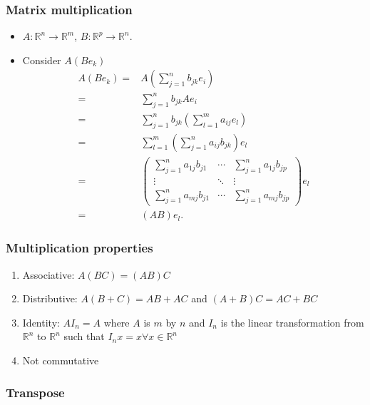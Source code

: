 \documentclass[compress]{beamer}
\def\R{\mathbb{R}}
\begin{document}
\begin{frame}
  \frametitle{Matrix multiplication}
  \begin{itemize}
  \item $A: \R^n \rightarrow \R^m$, $B:\R^p \rightarrow \R^n$.
  \item Consider $A(B e_k)$
    \begin{align*}
      A(B e_k) = & A (\sum_{j=1}^n b_{jk} e_i) \\
      = & \sum_{j=1}^n b_{jk} A e_i \\
      = & \sum_{j=1}^n b_{jk} \left(\sum_{l=1}^m a_{ij} e_l\right)  \\
      = & \sum_{l=1}^m \left(\sum_{j=1}^n a_{ij} b_{jk} \right) e_l \\
      = & \begin{pmatrix} 
        \sum_{j=1}^n a_{1j} b_{j1} & \cdots & \sum_{j=1}^n a_{1j} b_{jp} \\
        \vdots & \ddots & \vdots \\
        \sum_{j=1}^n a_{mj} b_{j1} & \cdots & \sum_{j=1}^n a_{mj} b_{jp}
      \end{pmatrix} e_l \\
      = & (AB) e_l.
    \end{align*}
  \end{itemize}
\end{frame}

\begin{frame}
  \frametitle{Multiplication properties}
  \begin{enumerate}
  \item Associative: $A(BC) = (AB) C$
  \item Distributive: $A(B+C) = AB + AC$ and $(A+B)C = AC + BC$
  \item Identity: $AI_n = A$ where $A$ is $m$ by $n$ and $I_n$ is the
    linear transformation from $\R^n$ to $\R^n$ such that $I_nx = x
    \forall x \in \R^n$
  \item Not commutative
  \end{enumerate}
\end{frame}

\subsubsection{Transpose}
\end{document}
